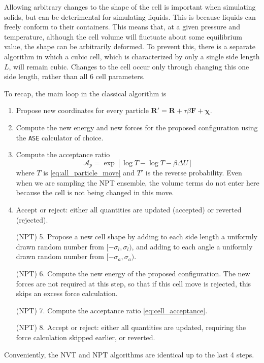 \documentclass{article}
\begin{document}
Allowing arbitrary changes to the shape of the cell is important when simulating solids, but can be deterimental for simulating liquids.
This is because liquids can freely conform to their containers.
This means that, at a given pressure and temperature, although the cell volume will fluctuate about some equilibrium value, the shape can be arbitrarily deformed.
To prevent this, there is a separate algorithm in which a cubic cell, which is characterized by only a single side length $L$, will remain cubic.
Changes to the cell occur only through changing this one side length, rather than all 6 cell parameters.

To recap, the main loop in the classical algorithm is
\begin{enumerate}
    \item Propose new coordinates for every particle $\boldsymbol{R}' = \boldsymbol{R} + \tau \beta \boldsymbol{F} + \boldsymbol{\chi}$.
    \item Compute the new energy and new forces for the proposed configuration using the \texttt{ASE} calculator of choice.
    \item Compute the acceptance ratio
        \begin{equation}
            \label{eq:particle_acceptance}
            \mathcal{A}_p = \exp \left[ \log T - \log T - \beta \Delta U \right]
        \end{equation}
        where $T$ is \eqref{eq:all_particle_move} and $T'$ is the reverse probability.
        Even when we are sampling the NPT ensemble, the volume terms do not enter here because the cell is not being changed in this move.
    \item Accept or reject: either all quantities are updated (accepted) or reverted (rejected).
    \item[(NPT) 5.] Propose a new cell shape by adding to each side length a uniformly drawn random number from $[-\sigma_l, \sigma_l)$, and adding to each angle a uniformly drawn random number from $[-\sigma_a, \sigma_a)$.
    \item[(NPT) 6.] Compute the new energy of the proposed configuration.
        The new forces are not required at this step, so that if this cell move is rejected, this skips an excess force calculation.
    \item[(NPT) 7.] Compute the acceptance ratio \eqref{eq:cell_acceptance}.
    \item[(NPT) 8.] Accept or reject: either all quantities are updated, requiring the force calculation skipped earlier, or reverted.
\end{enumerate}
Conveniently, the NVT and NPT algorithms are identical up to the last 4 steps.
\end{document}
